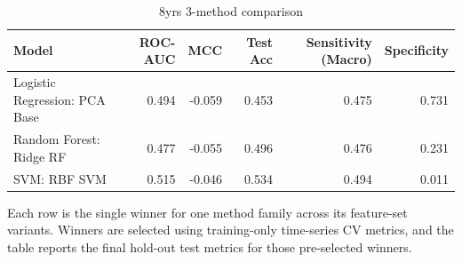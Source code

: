 \begin{table}[htbp]
\centering
\caption{8yrs 3-method comparison}
\label{tab:8yrs_3methods_comparison}
\begin{tabular}{lrrrrr}
\toprule
Model & ROC-AUC & MCC & Test Acc & Sensitivity (Macro) & Specificity \\
\midrule
Logistic Regression: PCA Base & 0.494 & -0.059 & 0.453 & 0.475 & 0.731 \\
Random Forest: Ridge RF & 0.477 & -0.055 & 0.496 & 0.476 & 0.231 \\
SVM: RBF SVM & 0.515 & -0.046 & 0.534 & 0.494 & 0.011 \\
\bottomrule
\end{tabular}
\par\smallskip
\footnotesize Each row is the single winner for one method family across its feature-set variants. Winners are selected using training-only time-series CV metrics, and the table reports the final hold-out test metrics for those pre-selected winners.
\end{table}

